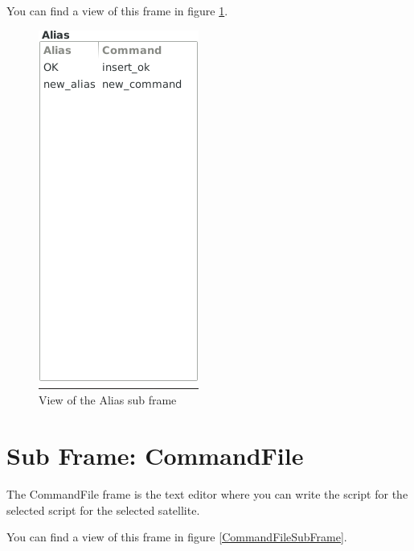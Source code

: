 \documentclass[pdftex,11pt,a4paper,titlepage]{report}
\begin{document}
You can find a view of this frame in figure \ref{AliasSubFrame}.
\begin{figure}[h]
\centering
\includegraphics[scale=0.6]{../images/AliasSubFrame.png}
\caption{View of the Alias sub frame}
\label{AliasSubFrame}
\end{figure}

\section{Sub Frame: CommandFile}
\hspace{0.4cm} The CommandFile frame is the text editor where you can write the script for the selected script for the selected satellite. 

You can find a view of this frame in figure \ref{CommandFileSubFrame}.
\end{document}
